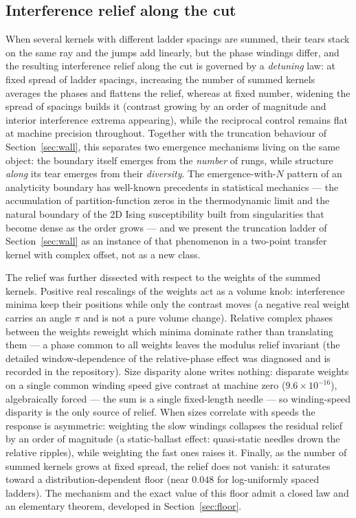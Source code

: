 \documentclass[11pt,a4paper]{article}
\begin{document}
\subsection{Interference relief along the cut}
\label{sec:relief}

When several kernels with
different ladder spacings are summed, their tears stack on the same ray
and the jumps add linearly, but the phase windings differ, and the
resulting interference relief along the cut is governed by a
\emph{detuning} law: at fixed spread of ladder spacings, increasing the
number of summed kernels averages the phases and flattens the relief,
whereas at fixed number, widening the spread of spacings builds it
(contrast growing by an order of magnitude and interior interference
extrema appearing), while the reciprocal control remains flat at
machine precision throughout. Together with the truncation behaviour of
Section~\ref{sec:wall}, this separates two emergence mechanisms living
on the same object: the boundary itself emerges from the \emph{number}
of rungs, while structure \emph{along} its tear emerges from their
\emph{diversity}. The emergence-with-$N$ pattern of an analyticity
boundary has well-known precedents in statistical mechanics --- the
accumulation of partition-function zeros in the thermodynamic limit
\cite{LeeYang1952} and the natural boundary of the 2D Ising
susceptibility built from singularities that become dense as the order
grows \cite{Nickel1999} --- and we present the truncation ladder of
Section~\ref{sec:wall} as an instance of that phenomenon in a
two-point transfer kernel with complex offset, not as a new class.

The relief was further dissected with respect to the weights of the
summed kernels. Positive real rescalings of the weights act as a volume
knob: interference minima keep their positions while only the contrast moves
(a negative real weight carries an angle $\pi$ and is not a pure volume
change). Relative complex phases between the weights reweight which minima
dominate rather than translating them --- a phase common to all weights
leaves the modulus relief invariant (the detailed window-dependence of the
relative-phase effect was diagnosed and is recorded in the repository). Size disparity alone
writes nothing: disparate weights on a single common winding speed give
contrast at machine zero ($9.6\times10^{-16}$), algebraically forced ---
the sum is a single fixed-length needle --- so winding-speed disparity
is the only source of relief. When sizes correlate with speeds the
response is asymmetric: weighting the slow windings collapses the
residual relief by an order of magnitude (a static-ballast effect:
quasi-static needles drown the relative ripples), while weighting the
fast ones raises it. Finally, as the number of summed kernels grows at
fixed spread, the relief does not vanish: it saturates toward a
distribution-dependent floor (near $0.048$ for log-uniformly spaced
ladders). The mechanism and the exact value of this floor admit a
closed law and an elementary theorem, developed in
Section~\ref{sec:floor}.
\end{document}
